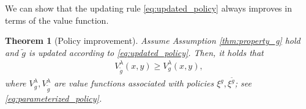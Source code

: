 \documentclass[11pt]{amsart}
\newcommand{\jo}[1]{{\textcolor{blue}{#1}}}
\newtheorem{theorem}{Theorem}[section]
\theoremstyle{plain}
\def \R{\mathbb{R}}
\numberwithin{equation}{section}
\begin{document}
We can show that the updating rule  \eqref{eq:updated_policy} always improves in terms of the value function. 


\begin{theorem}[Policy improvement]\label{prop:policy_improvement}  Assume Assumption \ref{thm:property_g} hold and $ \widetilde{g}$ is updated according to \eqref{eq:updated_policy}. 
Then, it holds that
    \begin{eqnarray}\label{eq:policy_improvement}
        V^\lambda_{\widetilde{g}}(x,y)\ge V^\lambda_g(x,y),
    \end{eqnarray}
    where $V^\lambda_g, V^\lambda_{\widetilde{g}}$ are value functions associated with policies $\xi^g, \xi^{\widetilde{g}}$; see \eqref{eq:parameterized_policy}.
\end{theorem}
\end{document}
